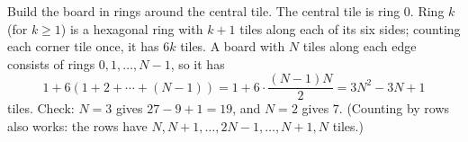 Build the board in rings around the central tile. The central tile is ring $0$. Ring $k$ (for $k\ge1$) is a hexagonal ring with $k+1$ tiles along each of its six sides; counting each corner tile once, it has $6k$ tiles. A board with $N$ tiles along each edge consists of rings $0,1,\dots,N-1$, so it has
\[1+6\left(1+2+\cdots+(N-1)\right)=1+6\cdot\dfrac{(N-1)N}{2}=\boxed{3N^2-3N+1}\]
tiles. Check: $N=3$ gives $27-9+1=19$, and $N=2$ gives $7$. (Counting by rows also works: the rows have $N,N+1,\dots,2N-1,\dots,N+1,N$ tiles.)
